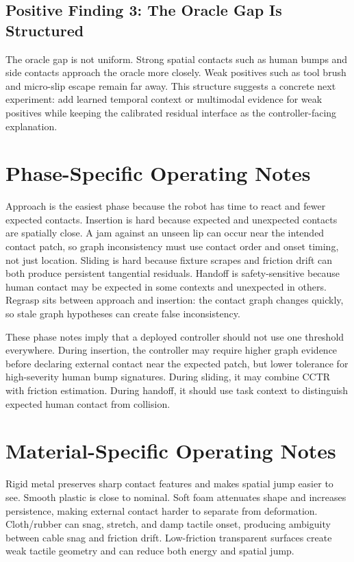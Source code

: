 \documentclass{article}
\newcommand{\method}{CCTR}
\begin{document}
\subsection{Positive Finding 3: The Oracle Gap Is Structured}

The oracle gap is not uniform. Strong spatial contacts such as human bumps and side contacts approach the oracle more closely. Weak positives such as tool brush and micro-slip escape remain far away. This structure suggests a concrete next experiment: add learned temporal context or multimodal evidence for weak positives while keeping the calibrated residual interface as the controller-facing explanation.

\section{Phase-Specific Operating Notes}

Approach is the easiest phase because the robot has time to react and fewer expected contacts. Insertion is hard because expected and unexpected contacts are spatially close. A jam against an unseen lip can occur near the intended contact patch, so graph inconsistency must use contact order and onset timing, not just location. Sliding is hard because fixture scrapes and friction drift can both produce persistent tangential residuals. Handoff is safety-sensitive because human contact may be expected in some contexts and unexpected in others. Regrasp sits between approach and insertion: the contact graph changes quickly, so stale graph hypotheses can create false inconsistency.

These phase notes imply that a deployed controller should not use one threshold everywhere. During insertion, the controller may require higher graph evidence before declaring external contact near the expected patch, but lower tolerance for high-severity human bump signatures. During sliding, it may combine \method{} with friction estimation. During handoff, it should use task context to distinguish expected human contact from collision.

\section{Material-Specific Operating Notes}

Rigid metal preserves sharp contact features and makes spatial jump easier to see. Smooth plastic is close to nominal. Soft foam attenuates shape and increases persistence, making external contact harder to separate from deformation. Cloth/rubber can snag, stretch, and damp tactile onset, producing ambiguity between cable snag and friction drift. Low-friction transparent surfaces create weak tactile geometry and can reduce both energy and spatial jump.
\end{document}
